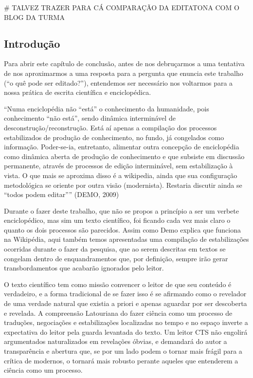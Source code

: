 # TALVEZ TRAZER PARA CÁ COMPARAÇÃO DA EDITATONA COM O BLOG DA TURMA


\subsection{Introdução}

Para abrir este capítulo de conclusão, antes de nos debruçarmos a uma tentativa de nos aproximarmos a uma resposta para a pergunta que enuncia este trabalho (``o quê pode ser editado?''), entendemos ser necessário nos voltarmos para a nossa prática de escrita científica e enciclopédica.

``Numa enciclopédia não ``está'' o conhecimento da humanidade, pois conhecimento ``não está'', sendo dinâmica interminável de desconstrução/reconstrução. Está aí apenas a compilação dos processos estabilizados de produção de conhecimento, no fundo, já congelados como informação. Poder-se-ia, entretanto, alimentar outra concepção de enciclopédia como dinâmica aberta de produção de conhecimento e que subsiste em discussão permanente, através de processos de edição interminável, sem estabilização à vista. O que mais se aproxima disso é a wikipedia, ainda que sua configuração metodológica se oriente por outra visão (modernista). Restaria discutir ainda se ``todos podem editar'''' (DEMO, 2009)

Durante o fazer deste trabalho, que não se propos a princípio a ser um verbete enciclopédico, mas sim um texto científico, foi ficando cada vez mais claro o quanto os dois processos são parecidos. Assim como Demo explica que funciona na Wikipédia, aqui também temos apresentadas uma compilação de estabilizações ocorridas durante o fazer da pesquisa, que ao serem descritas em textos se congelam dentro de enquandramentos que, por definição, sempre irão gerar transbordamentos que acabarão ignorados pelo leitor.

O texto científico tem como missão convencer o leitor de que seu conteúdo é verdadeiro, e a forma tradicional de se fazer isso é se afirmando como o revelador de uma verdade natural que existia a priori e apenas aguardar por ser descoberta e revelada. A compreensão Latouriana do fazer ciência como um processo de traduções, negociações e estabilizações localizadas no tempo e no espaço inverte a expectativa do leitor pela guarda levantada do texto. Um leitor CTS não engolirá argumentados naturalizados em revelações óbvias, e demandará do autor a transparência e abertura que, se por um lado podem o tornar mais frágil para a crítica de modernos, o tornará mais robusto perante aqueles que entenderem a ciência como um processo.

